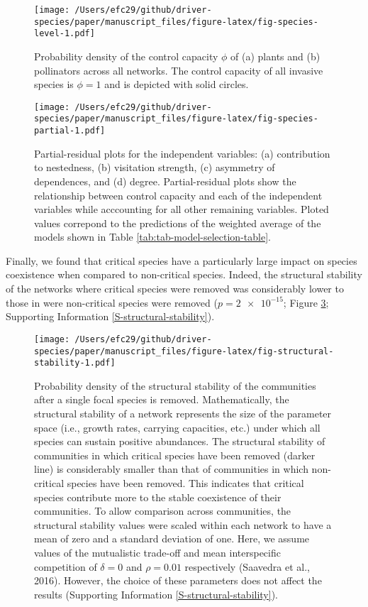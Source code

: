 \documentclass[a4paper]{artikel1}
\theoremstyle{definition}
\theoremstyle{definition}
\theoremstyle{definition}
\theoremstyle{remark}
\begin{document}
\begin{figure}
\centering
\texttt{[image: /Users/efc29/github/driver-species/paper/manuscript\_files/figure-latex/fig-species-level-1.pdf]}
\caption{\label{fig:fig-species-level}Probability density of the control
capacity \(\phi\) of (a) plants and (b) pollinators across all networks.
The control capacity of all invasive species is \(\phi = 1\) and is
depicted with solid circles.}
\end{figure}

\begin{figure}
\centering
\texttt{[image: /Users/efc29/github/driver-species/paper/manuscript\_files/figure-latex/fig-species-partial-1.pdf]}
\caption{\label{fig:fig-species-partial}Partial-residual plots for the
independent variables: (a) contribution to nestedness, (b) visitation
strength, (c) asymmetry of dependences, and (d) degree. Partial-residual
plots show the relationship between control capacity and each of the
independent variables while acccounting for all other remaining
variables. Ploted values correpond to the predictions of the weighted
average of the models shown in Table
\ref{tab:tab-model-selection-table}.}
\end{figure}

Finally, we found that critical species have a particularly large impact
on species coexistence when compared to non-critical species. Indeed,
the structural stability of the networks where critical species were
removed was considerably lower to those in were non-critical species
were removed (\(p = \num{2e-15}\); Figure
\ref{fig:fig-structural-stability}; Supporting Information
\ref{S-structural-stability}).

\begin{figure}
\centering
\texttt{[image: /Users/efc29/github/driver-species/paper/manuscript\_files/figure-latex/fig-structural-stability-1.pdf]}
\caption{\label{fig:fig-structural-stability}Probability density of the
structural stability of the communities after a single focal species is
removed. Mathematically, the structural stability of a network
represents the size of the parameter space (i.e., growth rates, carrying
capacities, etc.) under which all species can sustain positive
abundances. The structural stability of communities in which critical
species have been removed (darker line) is considerably smaller than
that of communities in which non-critical species have been removed.
This indicates that critical species contribute more to the stable
coexistence of their communities. To allow comparison across
communities, the structural stability values were scaled within each
network to have a mean of zero and a standard deviation of one. Here, we
assume values of the mutualistic trade-off and mean interspecific
competition of \(\delta = 0\) and \(\rho = 0.01\) respectively (Saavedra
et al., 2016). However, the choice of these parameters does not affect
the results (Supporting Information \ref{S-structural-stability}).}
\end{figure}
\end{document}

